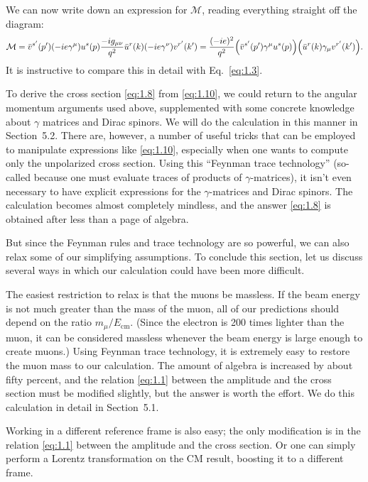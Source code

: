 We can now write down an expression for $\mathcal{M}$, reading everything
straight off the diagram:
\begin{equation}
  \mathcal{M} =
    \bar{v}^{s'}(p')(-ie\gamma^{\mu})u^{s}(p)
    \frac{-ig_{\mu\nu}}{q^{2}}
    \bar{u}^{r}(k)(-ie\gamma^{\nu})v^{r'}(k')
    = \frac{(-ie)^{2}}{q^{2}}
      \Bigl(\bar{v}^{s'}(p')\gamma^{\mu}u^{s}(p)\Bigr)
      \Bigl(\bar{u}^{r}(k)\gamma_{\mu}v^{r'}(k')\Bigr).
  \label{eq:1.10}
\end{equation}
It is instructive to compare this in detail with Eq.~\eqref{eq:1.3}.

To derive the cross section \eqref{eq:1.8} from \eqref{eq:1.10}, we could
return to the angular momentum arguments used above, supplemented with
some concrete knowledge about $\gamma$ matrices and Dirac spinors.  We will
do the calculation in this manner in Section~5.2.  There are, however, a
number of useful tricks that can be employed to manipulate expressions
like \eqref{eq:1.10}, especially when one wants to compute only the
unpolarized cross section.  Using this ``Feynman trace technology''
(so-called because one must evaluate traces of products of
$\gamma$-matrices), it isn't even necessary to have explicit expressions
for the $\gamma$-matrices and Dirac spinors.  The calculation becomes
almost completely mindless, and the answer \eqref{eq:1.8} is obtained
after less than a page of algebra.

But since the Feynman rules and trace technology are so powerful, we can
also relax some of our simplifying assumptions.  To conclude this section,
let us discuss several ways in which our calculation could have been more
difficult.

The easiest restriction to relax is that the muons be massless.  If the
beam energy is not much greater than the mass of the muon, all of our
predictions should depend on the ratio $m_\mu/E_{\mathrm{cm}}$.  (Since the
electron is 200 times lighter than the muon, it can be considered massless
whenever the beam energy is large enough to create muons.)  Using Feynman
trace technology, it is extremely easy to restore the muon mass to our
calculation.  The amount of algebra is increased by about fifty percent,
and the relation \eqref{eq:1.1} between the amplitude and the cross
section must be modified slightly, but the answer is worth the effort.
We do this calculation in detail in Section~5.1.

Working in a different reference frame is also easy; the only modification
is in the relation \eqref{eq:1.1} between the amplitude and the cross
section.  Or one can simply perform a Lorentz transformation on the CM
result, boosting it to a different frame.

